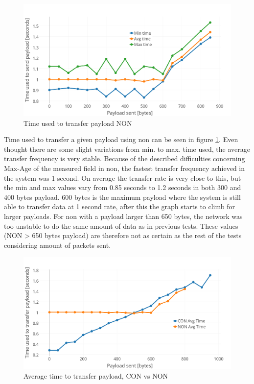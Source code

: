 \begin{figure}[h!]
    \centering
    \includegraphics[width=1.0\textwidth]{bytesPrSecondNewNON.png}    
    \caption{Time used to transfer payload NON}
    \label{fig:bytesPRSecond4}
\end{figure}

\noindent Time used to transfer a given payload using \gls{non} can be seen in figure \ref{fig:bytesPRSecond4}. Even thought there are some slight variations from min. to max. time used, the average transfer frequency is very stable. Because of the described difficulties concerning Max-Age of the measured field in \gls{non}, the fastest transfer frequency achieved in the system was 1 second. On average the transfer rate is very close to this, but the min and max values vary from 0.85 seconds to 1.2 seconds in both 300 and 400 bytes payload. 600 bytes is the maximum payload where the system is still able to transfer data at 1 second rate, after this the graph starts to climb for larger payloads. For \gls{non} with a payload larger than 650 bytes, the network was too unstable to do the same amount of data as in previous tests. These values (NON > 650 bytes payload) are therefore not as certain as the rest of the tests considering amount of packets sent.


\begin{figure}[h!]
    \centering
    \includegraphics[width=1.0\textwidth]{avgTimeCONNON.png}    
    \caption{Average time to transfer payload, CON vs NON}
    \label{fig:avgTimeCONNON}
\end{figure}




